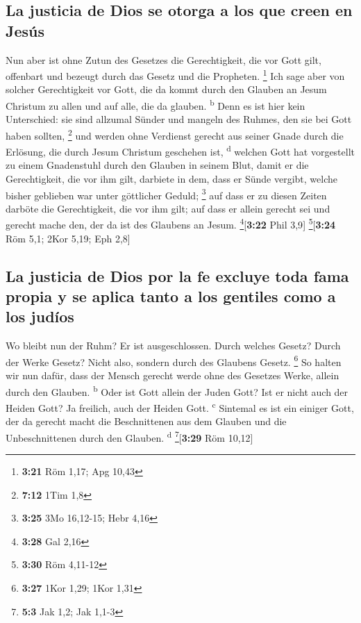\hypertarget{la-justicia-de-dios-se-otorga-a-los-que-creen-en-jesuxfas}{%
\subsection{La justicia de Dios se otorga a los que creen en
Jesús}\label{la-justicia-de-dios-se-otorga-a-los-que-creen-en-jesuxfas}}

 Nun aber ist ohne Zutun des Gesetzes die Gerechtigkeit,
die vor Gott gilt, offenbart und bezeugt durch das Gesetz und die
Propheten. \footnote{\textbf{3:21} Röm 1,17; Apg 10,43} 
Ich sage aber von solcher Gerechtigkeit vor Gott, die da kommt durch den
Glauben an Jesum Christum zu allen und auf alle, die da glauben.
\textsuperscript{b}  Denn es ist hier kein Unterschied:
sie sind allzumal Sünder und mangeln des Ruhmes, den sie bei Gott haben
sollten, \footnote{\textbf{7:12} 1Tim 1,8}  und werden
ohne Verdienst gerecht aus seiner Gnade durch die Erlösung, die durch
Jesum Christum geschehen ist, \textsuperscript{d} 
welchen Gott hat vorgestellt zu einem Gnadenstuhl durch den Glauben in
seinem Blut, damit er die Gerechtigkeit, die vor ihm gilt, darbiete in
dem, dass er Sünde vergibt, welche bisher geblieben war unter göttlicher
Geduld; \footnote{\textbf{3:25} 3Mo 16,12-15; Hebr 4,16} 
auf dass er zu diesen Zeiten darböte die Gerechtigkeit, die vor ihm
gilt; auf dass er allein gerecht sei und gerecht mache den, der da ist
des Glaubens an Jesum. \footnote{\textbf{3:28} Gal 2,16}{[}\textbf{3:22}
Phil 3,9{]} \footnote{\textbf{3:30} Röm 4,11-12}{[}\textbf{3:24} Röm
5,1; 2Kor 5,19; Eph 2,8{]}

\hypertarget{la-justicia-de-dios-por-la-fe-excluye-toda-fama-propia-y-se-aplica-tanto-a-los-gentiles-como-a-los-juduxedos}{%
\subsection{La justicia de Dios por la fe excluye toda fama propia y se
aplica tanto a los gentiles como a los
judíos}\label{la-justicia-de-dios-por-la-fe-excluye-toda-fama-propia-y-se-aplica-tanto-a-los-gentiles-como-a-los-juduxedos}}

 Wo bleibt nun der Ruhm? Er ist ausgeschlossen. Durch
welches Gesetz? Durch der Werke Gesetz? Nicht also, sondern durch des
Glaubens Gesetz. \footnote{\textbf{3:27} 1Kor 1,29; 1Kor 1,31}
 So halten wir nun dafür, dass der Mensch gerecht werde
ohne des Gesetzes Werke, allein durch den Glauben. \textsuperscript{b}
 Oder ist Gott allein der Juden Gott? Ist er nicht auch
der Heiden Gott? Ja freilich, auch der Heiden Gott. \textsuperscript{c}
 Sintemal es ist ein einiger Gott, der da gerecht macht
die Beschnittenen aus dem Glauben und die Unbeschnittenen durch den
Glauben. \textsuperscript{d} \footnote{\textbf{5:3} Jak 1,2; Jak 1,1-3}{[}\textbf{3:29}
Röm 10,12{]}

